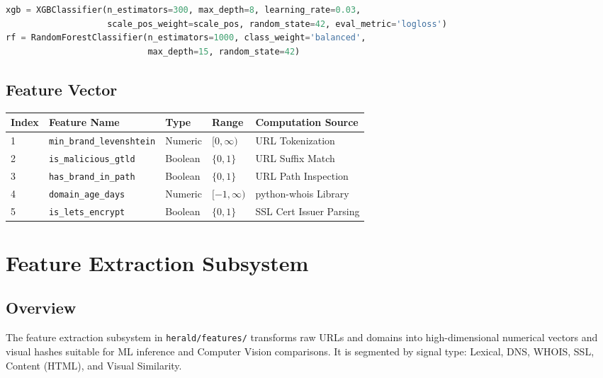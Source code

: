 \documentclass[12pt,a4paper]{report}
\begin{document}
\begin{lstlisting}[language=Python]
xgb = XGBClassifier(n_estimators=300, max_depth=8, learning_rate=0.03, 
                    scale_pos_weight=scale_pos, random_state=42, eval_metric='logloss')
rf = RandomForestClassifier(n_estimators=1000, class_weight='balanced', 
                            max_depth=15, random_state=42)
\end{lstlisting}

\section{Feature Vector}
\begin{longtable}{|p{1cm}|p{5cm}|p{2cm}|p{2cm}|p{4cm}|}
\hline
\textbf{Index} & \textbf{Feature Name} & \textbf{Type} & \textbf{Range} & \textbf{Computation Source} \\
\hline
\endhead
1 & \texttt{min\_brand\_levenshtein} & Numeric & $[0, \infty)$ & URL Tokenization \\
2 & \texttt{is\_malicious\_gtld} & Boolean & $\{0, 1\}$ & URL Suffix Match \\
3 & \texttt{has\_brand\_in\_path} & Boolean & $\{0, 1\}$ & URL Path Inspection \\
4 & \texttt{domain\_age\_days} & Numeric & $[-1, \infty)$ & python-whois Library \\
5 & \texttt{is\_lets\_encrypt} & Boolean & $\{0, 1\}$ & SSL Cert Issuer Parsing \\
\hline
\end{longtable}

\chapter{Feature Extraction Subsystem}
\section{Overview}
The feature extraction subsystem in \texttt{herald/features/} transforms raw URLs and domains into high-dimensional numerical vectors and visual hashes suitable for ML inference and Computer Vision comparisons. It is segmented by signal type: Lexical, DNS, WHOIS, SSL, Content (HTML), and Visual Similarity.
\end{document}
